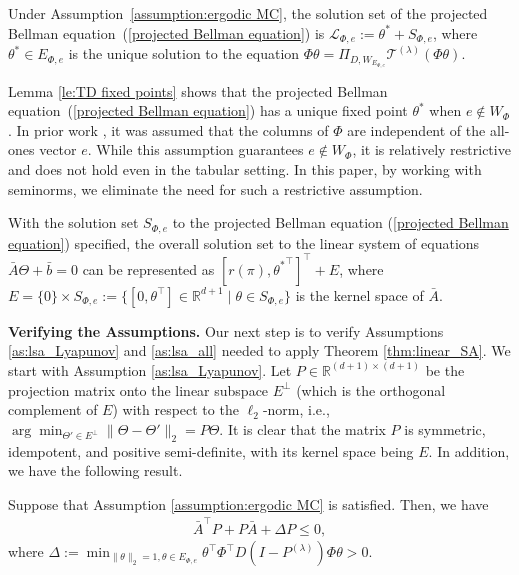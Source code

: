 \documentclass[11 pt]{article}
\begin{document}
	\begin{lemma}
		\label{le:TD fixed points}
		Under Assumption~\ref{assumption:ergodic MC}, the solution set of the projected Bellman equation~(\ref{projected Bellman equation}) is $ \mathcal{L}_{\Phi, e} := \theta^* + S_{\Phi, e} $, where $ \theta^* \in E_{\Phi, e} $ is the unique solution to the equation $ \Phi \theta = \Pi_{D,W_{E_{\Phi, e}}} \mathcal{T}^{(\lambda)} \left(\Phi \theta\right) $.
	\end{lemma}
	
	\begin{remark}
		Lemma \ref{le:TD fixed points} shows that the projected Bellman equation~(\ref{projected Bellman equation}) has a unique fixed point $ \theta^* $ when $ e \not \in W_{\Phi} $. In prior work \cite{tsitsiklis1999average,zhang2021average}, it was assumed that the columns of $ \Phi $ are independent of the all-ones vector $ e $. While this assumption guarantees $ e \not \in W_{\Phi} $, it is relatively restrictive and does not hold even in the tabular setting. In this paper, by working with seminorms, we eliminate the need for such a restrictive assumption.
	\end{remark}
	
	With the solution set $S_{\Phi, e}$ to the projected Bellman equation (\ref{projected Bellman equation}) specified, the overall solution set to the linear system of equations $\bar{A}\Theta+\bar{b}=0$ can be represented as $[r(\pi),{\theta^*}^\top ]^\top +E$, where $E=\{0\} \times S_{\Phi, e}:= \{[0, \theta^\top] \in \mathbb{R}^{d+1} \mid \theta \in S_{\Phi, e}\}$ is the kernel space of $\bar{A}$.
	
	\vspace{3 mm}
	\noindent\textbf{Verifying the Assumptions.} Our next step is to verify Assumptions \ref{as:lsa_Lyapunov} and \ref{as:lsa_all} needed to apply Theorem \ref{thm:linear_SA}. We start with Assumption \ref{as:lsa_Lyapunov}. Let $P\in\mathbb{R}^{(d+1)\times (d+1)}$ be the projection matrix onto the linear subspace $E^\perp$ (which is the orthogonal complement of $E$) with respect to the $\ell_2$-norm, i.e., $\arg\min_{\Theta'\in E^\perp}\|\Theta-\Theta'\|_2=P\Theta$. It is clear that the matrix $P$ is symmetric, idempotent, and positive semi-definite, with its kernel space being $E$. In addition, we have the following result.
	
	\begin{lemma}\label{le:TDLFA_Lyapunov}
		Suppose that Assumption \ref{assumption:ergodic MC} is satisfied. Then, we have
		\begin{align*}
			\bar{A}^\top P+P\bar{A}+\Delta P\leq 0,
		\end{align*}
		where $\Delta:=\min_{\|\theta\|_2=1, \theta\in E_{\Phi, e}} \theta^\top\Phi^\top D ( I - P^{(\lambda)} )\Phi\theta>0$.
	\end{lemma}
	
\end{document}
